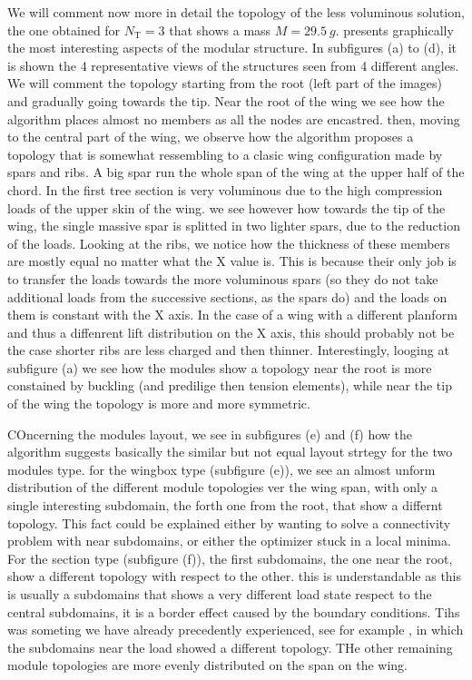 We will comment now more in detail the topology of the less voluminous solution, the one obtained for $N_\text{T}=3$ that shows a mass $M=\qty{29.5}{g}$.  presents graphically the most interesting aspects of the modular structure. In subfigures (a) to (d), it is shown the 4 representative views of the structures seen from 4 different angles. We will comment the topology starting from the root (left part of the images) and gradually going towards the tip. Near the root of the wing we see how the algorithm places almost no members as all the nodes are encastred. then, moving to the central part of the wing, we observe how the algorithm proposes a topology that is somewhat ressembling to a clasic wing configuration made by spars and ribs. A big spar run the whole span of the wing at the upper half of the chord. In the first tree section is very voluminous due to the high compression loads of the upper skin of the wing. we see however how towards the tip of the wing, the single massive spar is splitted in two lighter spars, due to the reduction of the loads. Looking at the ribs, we notice how the thickness of these members are mostly equal no matter what the X value is. This is because their only job is to transfer the loads towards the more voluminous spars (so they do not take additional loads from the successive sections, as the spars do) and the loads on them is constant with the X axis. In the case of a wing with a different planform and thus a diffenrent lift distribution on the X axis, this should probably not be the case \ie shorter ribs are less charged and then thinner. Interestingly, looging at subfigure (a) we see how the modules show a topology near the root is more constained by buckling (and predilige then tension elements), while near the tip of the wing the topology is more and more symmetric.

COncerning the modules layout, we see in subfigures (e) and (f) how the algorithm suggests basically the similar but not equal layout strtegy for the two modules type. for the wingbox type (subfigure (e)), we see an almost unform distribution of the different module topologies ver the wing span, with only a single interesting subdomain, the forth one from the root, that show a differnt topology. This fact could be explained either by wanting to solve a connectivity problem with near subdomains, or either the optimizer stuck in a local minima. For the section type (subfigure (f)), the first subdomains, the one near the root, show a different topology with respect to the other. this is understandable as this is usually a subdomains that shows a very different load state respect to the central subdomains, it is a border effect caused by the boundary conditions. Tihs was someting we have already precedently experienced, see for example , in which the subdomains near the load showed a different topology. THe other remaining module topologies are more evenly distributed on the span on the wing.

